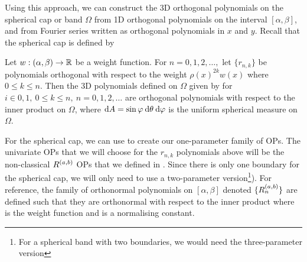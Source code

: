 Using this approach, we can construct the 3D orthogonal polynomials on the spherical cap or band $\Omega$ from 1D orthogonal polynomials on the interval $[\alpha,\beta]$, and from Fourier series written as orthogonal polynomials in $x$ and $y$. Recall that the spherical cap is defined by
\begin{proposition}\label{prop:sc:OPconstruction}
	Let $w : (\alpha,\beta) \to \mathbb{R}$ be a weight function. For $n = 0,1,2,\dots, $ let $\{r_{n,k}\}$ be polynomials orthogonal with respect to the weight $\rho(x)^{2k} w(x)$ where $0 \le k \le n$. Then the 3D polynomials defined on $\Omega$ given by
for $i \in {0,1}, \: 0 \le k \le n, \: n = 0,1,2,\dots$ are orthogonal polynomials with respect to the inner product
on $\Omega$, where ${\rm d} A = \sin\varphi \: {\rm d} \theta \: {\rm d} \varphi$ is the uniform spherical measure on $\Omega$. 
\end{proposition}

For the spherical cap, we can use  to create our one-parameter family of OPs. The univariate OPs that we will choose for the $r_{n,k}$ polynomials above will be the non-classical $R^{(a,b)}$ OPs that we defined in . Since there is only one boundary for the spherical cap, we will only need to use a two-parameter version\footnote{For a spherical band with two boundaries, we would need the three-parameter version}). For reference, the family of orthonormal polynomials on $[\alpha,\beta]$ denoted $\{R_n^{(a,b)}\}$ are defined such that they are orthonormal with respect to the inner product
where
 is the weight function and 
is a normalising constant.

